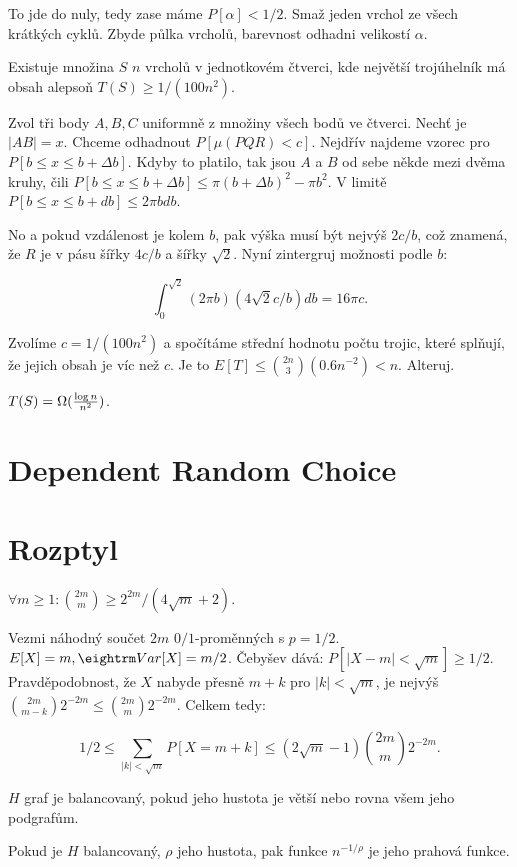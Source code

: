 To jde do nuly, tedy zase máme $P[\alpha] < 1/2$. Smaž jeden vrchol ze všech krátkých cyklů.
Zbyde půlka vrcholů, barevnost odhadni velikostí $\alpha$.

\thm{} Existuje množina $S$ $n$ vrcholů v jednotkovém čtverci, kde
největší trojúhelník má obsah alepsoň $T(S) \ge 1/(100n^2)$.

\prf{} Zvol tři body $A,B,C$ uniformně z množiny všech bodů ve
čtverci. Nechť je $|AB| = x$. Chceme odhadnout $P[\mu(PQR) < c]$.
Nejdřív najdeme vzorec pro $P[b \le x \le b + \Delta b]$. Kdyby to
platilo, tak jsou $A$ a $B$ od sebe někde mezi dvěma kruhy, čili $P[b
\le x \le b + \Delta b] \le \pi(b+\Delta b)^2 - \pi b^2$. V limitě
$P[b \le x \le b + db] \le 2\pi b db$.

No a pokud vzdálenost je kolem $b$, pak výška musí být nejvýš $2c/b$,
což znamená, že $R$ je v pásu šířky $4c/b$ a šířky $\sqrt{2}$. Nyní
zintergruj možnosti podle $b$:

$$ \int_0^{\sqrt{2}}(2 \pi b)(4 \sqrt{2} c / b) db = 16 \pi c. $$ 

Zvolíme $c = 1/(100n^2)$ a spočítáme střední hodnotu počtu trojic,
které splňují, že jejich obsah je víc než $c$. Je to $E[T] \le {2n
\choose 3}(0.6n^{-2}) < n$. Alteruj.

 $T(S) = \Omega({\log n \over n^2})$.
 
\section{Dependent Random Choice}

\section{Rozptyl}

\thm{} $\forall m\ge 1: {2m \choose m} \ge 2^{2m}/(4\sqrt{m}+2)$.

\prf{} Vezmi náhodný součet $2m$ $0/1$-proměnných s $p=1/2$. $E[X] = m, \var[X] = m/2$. Čebyšev dává: $P[|X-m| < \sqrt{m}] \ge 1/2$. 
Pravděpodobnost, že $X$ nabyde přesně $m+k$ pro $|k| < \sqrt{m}$, 
je nejvýš ${2m \choose m-k}2^{-2m} \le {2m \choose m}2^{-2m}$.
Celkem tedy:

$$1/2 \le \sum_{|k| < \sqrt{m}} P[X = m+k] \le (2\sqrt{m} -1) {2m \choose m} 2^{-2m}.$$

\dfn{} $H$ graf je {\I balancovaný}, pokud jeho hustota je větší nebo
rovna všem jeho podgrafům.

\thm{} Pokud je $H$ balancovaný, $\rho$ jeho hustota, pak funkce $n^{-1/\rho}$ je jeho prahová funkce.

